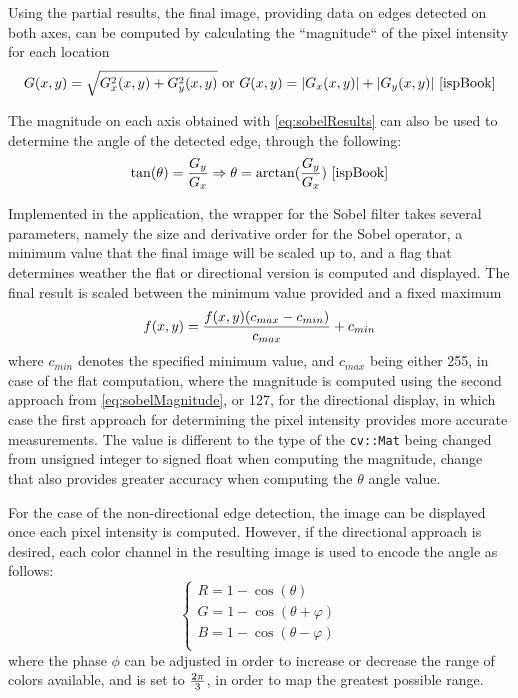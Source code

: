 Using the partial results, the final image, providing data on edges detected on both axes, can be computed
by calculating the ``magnitude`` of the pixel intensity for each location
\begin{equation}
	\label{eq:sobelMagnitude}
	G(x, y) = \sqrt{G_x^2(x, y) + G_y^2(x, y)}
	\text{ or }
	G(x, y) = |G_x(x, y)| + |G_y(x, y)|
	\text{ \cite{ispBook}}
\end{equation}

The magnitude on each axis obtained with \cref{eq:sobelResults} can also be used to determine the angle
of the detected edge, through the following:
\begin{equation}
	\label{eq:sobelTheta}
	\tan(\theta) = {G_y\over{G_x}} \Rightarrow \theta = \arctan({G_y\over{G_x}})
	\text{ \cite{ispBook}}
\end{equation}

Implemented in the application, the wrapper for the Sobel filter takes several parameters, namely the size
and derivative order for the Sobel operator, a minimum value that the final image will be scaled up to, and
a flag that determines weather the flat or directional version is computed and displayed. The final result
is scaled between the minimum value provided and a fixed maximum
\begin{equation}
	\label{eq:sobelScaling}
	f(x, y) = {f(x, y)(c_{max} - c_{min})\over{c_{max}}} + c_{min}
\end{equation}
where \(c_{min}\) denotes the specified minimum value, and \(c_{max}\) being either 255, in case of the flat
computation, where the magnitude is computed using the second approach from \cref{eq:sobelMagnitude}, or 127,
for the directional display, in which case the first approach for determining the pixel intensity provides
more accurate measurements. The value is different to the type of the \verb|cv::Mat| being changed from
unsigned integer to signed float when computing the magnitude, change that also provides greater accuracy when
computing the \(\theta\) angle value.

For the case of the non-directional edge detection, the image can be displayed once each pixel intensity is
computed. However, if the directional approach is desired, each color channel in the resulting image is used
to encode the angle as follows:
\begin{equation}
	\label{eq:sobelRGB}
	\begin{cases}
		R = {1 - \cos(\theta)}           \\
		G = {1 - \cos(\theta + \varphi)} \\
		B = {1 - \cos(\theta - \varphi)} \\
	\end{cases}
\end{equation}
where the phase \(\phi\) can be adjusted in order to increase or decrease the range of colors available, and
is set to \(2\pi\over3\), in order to map the greatest possible range.

